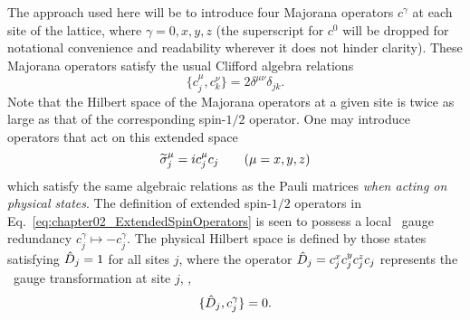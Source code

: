 The approach used here will be to introduce four Majorana operators $c^{\gamma}$ at each site of the lattice, where $\gamma = 0,x,y,z$ (the superscript for $c^0$ will be dropped for notational convenience and readability wherever it does not hinder clarity).
These Majorana operators satisfy the usual Clifford algebra relations
%
\begin{equation}
	\{c_j^{\mu}, c_k^{\nu}\} = 2\delta^{\mu\nu}\delta_{jk}.
\end{equation}
%
Note that the Hilbert space of the Majorana operators at a given site is twice as large as that of the corresponding spin-$1/2$ operator.
One may introduce operators that act on this extended space
%
\begin{equation}
	\widetilde{\sigma}_j^\mu = i c_j^{\mu} c_j \qquad (\mu = x,y,z)
	\label{eq:chapter02_ExtendedSpinOperators}
\end{equation}
%
which satisfy the same algebraic relations as the Pauli matrices \textit{when acting on physical states}.
The definition of extended spin-$1/2$ operators in Eq.~\eqref{eq:chapter02_ExtendedSpinOperators} is seen to possess a local \ZZ~gauge redundancy $c_j^\gamma \mapsto -c_j^\gamma$.
The physical Hilbert space is defined by those states satisfying $\hat{D}_j = 1$ for all sites $j$, where the operator $\hat{D}_j = c_j^x c_j^y c_j^z c_j$ represents the \ZZ~gauge transformation at site $j$, \ie,
%
\begin{equation}
	\{\hat{D}_j, c_j^{\gamma}\} = 0.
\end{equation}
%


